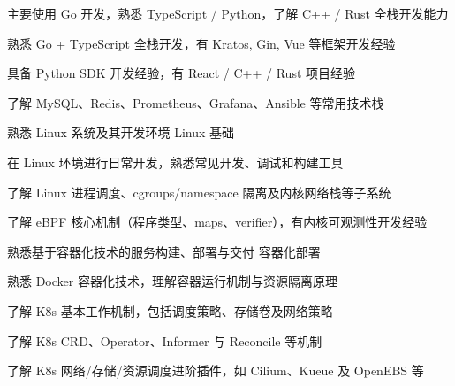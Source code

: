 
\begin{cventries}

\cventry
    {主要使用 Go 开发，熟悉 TypeScript / Python，了解 C++ / Rust}
    {全栈开发能力}
    {}
    {}
    {
        \begin{cvitems}
            \item {熟悉 Go + TypeScript 全栈开发，有 Kratos, Gin, Vue 等框架开发经验}
            \item {具备 Python SDK 开发经验，有 React / C++ / Rust 项目经验}
            \item {了解 MySQL、Redis、Prometheus、Grafana、Ansible 等常用技术栈}
        \end{cvitems}
    }

\vspace{0.5em}

\cventry
    {熟悉 Linux 系统及其开发环境}
    {Linux 基础}
    {}
    {}
    {
        \begin{cvitems}
            \item {在 Linux 环境进行日常开发，熟悉常见开发、调试和构建工具}
            \item {了解 Linux 进程调度、cgroups/namespace 隔离及内核网络栈等子系统}
            \item {了解 eBPF 核心机制（程序类型、maps、verifier），有内核可观测性开发经验}
        \end{cvitems}
    }

\vspace{0.3em}

\cventry
    {熟悉基于容器化技术的服务构建、部署与交付}
    {容器化部署}
    {}
    {}
    {
        \begin{cvitems}
            \item {熟悉 Docker 容器化技术，理解容器运行机制与资源隔离原理}
            \item {了解 K8s 基本工作机制，包括调度策略、存储卷及网络策略}
            \item {了解 K8s CRD、Operator、Informer 与 Reconcile 等机制}
            \item {了解 K8s 网络/存储/资源调度进阶插件，如 Cilium、Kueue 及 OpenEBS 等}
        \end{cvitems}
    }
\end{cventries}
